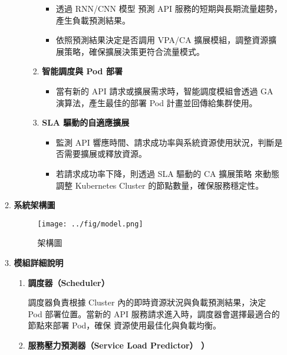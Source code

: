 \documentclass[12pt,a4paper]{article}
\begin{document}
\begin{enumerate}[label={(\zhdig*)}, leftmargin=2\parindent, listparindent=\parindent]
\begin{enumerate}[label={(\arabic*)}, leftmargin=\parindent, listparindent=\parindent]
\begin{enumerate}[label={(\zhdig*)}, leftmargin=\parindent, listparindent=\parindent]
\begin{enumerate}[label={(\arabic*)}, leftmargin=\parindent, listparindent=\parindent]
\begin{itemize}[leftmargin=\parindent, listparindent=\parindent]
    \item 透過 RNN/CNN 模型 預測 API 服務的短期與長期流量趨勢，產生負載預測結果。
    \item 依照預測結果決定是否調用 VPA/CA 擴展模組，調整資源擴展策略，確保擴展決策更符合流量模式。
\end{itemize}
    \item\textbf{
智能調度與 Pod 部署}
\begin{itemize}[leftmargin=\parindent, listparindent=\parindent]
    \item 當有新的 API 請求或擴展需求時，智能調度模組會透過 GA 演算法，產生最佳的部署 Pod 計畫並回傳給集群使用。
\end{itemize}
\item\textbf{SLA 驅動的自適應擴展}
\begin{itemize}[leftmargin=\parindent, listparindent=\parindent]
    \item 監測 API 響應時間、請求成功率與系統資源使用狀況，判斷是否需要擴展或釋放資源。
    \item 若請求成功率下降，則透過 SLA 驅動的 CA 擴展策略 來動態調整 Kubernetes Cluster 的節點數量，確保服務穩定性。
\end{itemize}


\end{enumerate}

\end{enumerate}
    \item \textbf{
系統架構圖}

\begin{figure} [htbp]

\centering

\texttt{[image: ../fig/model.png]}

\caption{架構圖}

\end{figure}\newpage

\item \textbf{
模組詳細說明}
\begin{enumerate}[label={(\zhdig*)}, leftmargin=\parindent, listparindent=\parindent]

    \item \textbf{
調度器（Scheduler）}

調度器負責根據 Cluster 內的即時資源狀況與負載預測結果，決定 Pod 部署位置。當新的 API 服務請求進入時，調度器會選擇最適合的節點來部署 Pod，確保 資源使用最佳化與負載均衡。

    \item \textbf{
服務壓力預測器（Service Load Predictor）
）}


\end{enumerate}
\end{enumerate}
\end{enumerate}
\end{document}
